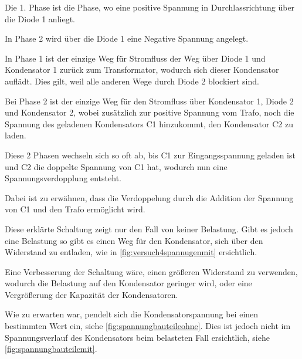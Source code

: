 \documentclass[11pt,ngerman]{scrartcl}
\begin{document}
Die 1. Phase ist die Phase, wo eine positive Spannung in Durchlassrichtung über die Diode 1 anliegt.

In Phase 2 wird über die Diode 1 eine Negative Spannung angelegt.

\vspace{2mm}

In Phase 1 ist der einzige Weg für Stromfluss der Weg über Diode 1 und Kondensator 1 zurück zum Transformator, wodurch sich dieser Kondensator auflädt.
Dies gilt, weil alle anderen Wege durch Diode 2 blockiert sind.

\vspace{2mm}

Bei Phase 2 ist der einzige Weg für den Stromfluss über Kondensator 1, Diode 2 und Kondensator 2, wobei zusätzlich zur positive Spannung vom Trafo, noch die Spannung des geladenen Kondensators C1 hinzukommt, den Kondensator C2 zu laden.

\vspace{2mm}

Diese 2 Phasen wechseln sich so oft ab, bis C1 zur Eingangsspannung geladen ist und C2 die doppelte Spannung von C1 hat, wodurch nun eine Spannungsverdopplung entsteht.

Dabei ist zu erwähnen, dass die Verdoppelung durch die Addition der Spannung von C1 und den Trafo ermöglicht wird.


\vspace{2mm}

Diese erklärte Schaltung zeigt nur den Fall von keiner Belastung.
Gibt es jedoch eine Belastung so gibt es einen Weg für den Kondensator, sich über den Widerstand zu entladen, wie in \autoref{fig:versuch4spannugenmit} ersichtlich.

\vspace{2mm}

Eine Verbesserung der Schaltung wäre, einen größeren Widerstand zu verwenden, wodurch die Belastung auf den Kondensator geringer wird, oder eine Vergrößerung der Kapazität der Kondensatoren.

\vspace{2mm}

Wie zu erwarten war, pendelt sich die Kondensatorspannung bei einen bestimmten
Wert ein, siehe \autoref{fig:spannungbauteileohne}. Dies ist jedoch nicht im
Spannungsverlauf des Kondensators beim belasteten Fall ersichtlich, siehe
\autoref{fig:spannungbauteilemit}.
\end{document}
